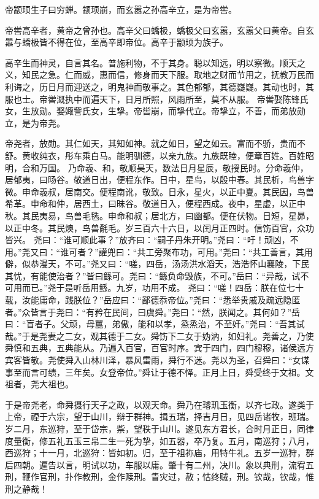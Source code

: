 \documentclass[UTF8,12pt,AutoFakeBold]{ctexart}
\begin{document}
	帝颛顼生子曰穷蝉。颛顼崩，而玄嚣之孙高辛立，是为帝喾。
	\par
	帝喾高辛者，黄帝之曾孙也。高辛父曰蟜极，蟜极父曰玄嚣，玄嚣父曰黄帝。自玄嚣与蟜极皆不得在位，至高辛即帝位。高辛于颛顼为族子。
	\par
	高辛生而神灵，自言其名。普施利物，不于其身。聪以知远，明以察微。顺天之义，知民之急。仁而威，惠而信，修身而天下服。取地之财而节用之，抚教万民而利诲之，历日月而迎送之，明鬼神而敬事之。其色郁郁，其德嶷嶷。其动也时，其服也士。帝喾溉执中而遍天下，日月所照，风雨所至，莫不从服。
	帝喾娶陈锋氏女，生放勋。娶娵訾氏女，生挚。帝喾崩，而挚代立。帝挚立，不善，而弟放勋立，是为帝尧。
	\par
	帝尧者，放勋。其仁如天，其知如神。就之如日，望之如云。富而不骄，贵而不舒。黄收纯衣，彤车乘白马。能明驯德，以亲九族。九族既睦，便章百姓。百姓昭明，合和万国。
	乃命羲、和，敬顺昊天，数法日月星辰，敬授民时。分命羲仲，居郁夷，曰旸谷。敬道日出，便程东作。日中，星鸟，以殷中春。其民析，鸟兽字微。申命羲叔，居南交。便程南讹，敬致。日永，星火，以正中夏。其民因，鸟兽希革。申命和仲，居西土，曰昧谷。敬道日入，便程西成。夜中，星虚，以正中秋。其民夷易，鸟兽毛毨。申命和叔；居北方，曰幽都。便在伏物。日短，星昴，以正中冬。其民燠，鸟兽氄毛。岁三百六十六日，以闰月正四时。信饬百官，众功皆兴。
	尧曰：“谁可顺此事？”放齐曰：“嗣子丹朱开明。”尧曰：“吁！顽凶，不用。”尧又曰：“谁可者？”讙兜曰：“共工旁聚布功，可用。”尧曰：“共工善言，其用僻，似恭漫天，不可。”尧又曰：“嗟，四岳，汤汤洪水滔天，浩浩怀山襄陵，下民其忧，有能使治者？”皆曰鲧可。尧曰：“鲧负命毁族，不可。”岳曰：“异哉，试不可用而已。”尧于是听岳用鲧。九岁，功用不成。
	尧曰：“嗟！四岳：朕在位七十载，汝能庸命，践朕位？”岳应曰：“鄙德忝帝位。”尧曰：“悉举贵戚及疏远隐匿者。”众皆言于尧曰：“有矜在民间，曰虞舜。”尧曰：“然，朕闻之。其何如？”岳曰：“盲者子。父顽，母嚚，弟傲，能和以孝，烝烝治，不至奸。”尧曰：“吾其试哉。”于是尧妻之二女，观其德于二女。舜饬下二女于妫汭，如妇礼。尧善之，乃使舜慎和五典，五典能从。乃遍入百官，百官时序。宾于四门，四门穆穆，诸侯远方宾客皆敬。尧使舜入山林川泽，暴风雷雨，舜行不迷。尧以为圣，召舜曰：“女谋事至而言可绩，三年矣。女登帝位。”舜让于德不怿。正月上日，舜受终于文祖。文祖者，尧大祖也。
	\par
	于是帝尧老，命舜摄行天子之政，以观天命。舜乃在璿玑玉衡，以齐七政。遂类于上帝，禋于六宗，望于山川，辩于群神。揖五瑞，择吉月日，见四岳诸牧，班瑞。岁二月，东巡狩，至于岱宗，祡，望秩于山川。遂见东方君长，合时月正日，同律度量衡，修五礼五玉三帛二生一死为挚，如五器，卒乃复。五月，南巡狩；八月，西巡狩；十一月，北巡狩：皆如初。归，至于祖祢庙，用特牛礼。五岁一巡狩，群后四朝。遍告以言，明试以功，车服以庸。肇十有二州，决川。象以典刑，流宥五刑，鞭作官刑，扑作教刑，金作赎刑。眚灾过，赦；怙终贼，刑。钦哉，钦哉，惟刑之静哉！
\end{document}
